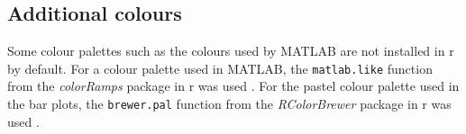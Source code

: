 \subsection{Additional colours}
\label{sub:additional_colours}

Some colour palettes such as the colours used by MATLAB are not installed in \gls{r} by default.
For a colour palette used in MATLAB, the \texttt{matlab.like} function from the \textit{colorRamps} package in \gls{r} was used \citep{Keitt2012}.
For the pastel colour palette used in the bar plots, the \texttt{brewer.pal} function from the \textit{RColorBrewer} package in \gls{r} was used \citep{Neuwirth2014}.

